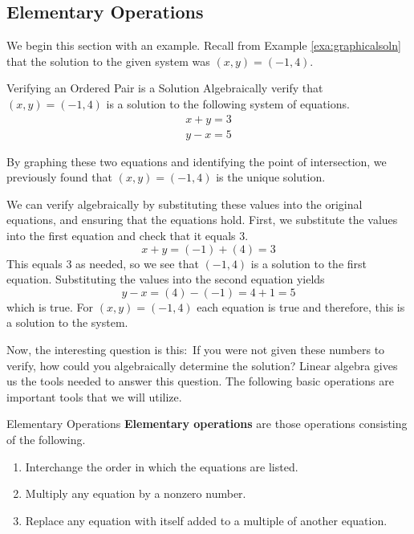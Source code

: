 \subsection{Elementary Operations}

We begin this section with an example. Recall from Example \ref{exa:graphicalsoln} that the solution to the given system was $\left(x, y \right) = \left( -1, 4 \right)$. 

\begin{example}{Verifying an Ordered Pair is a Solution}\label{exa:verifyingorderedpairsolution}
Algebraically verify that $\left(x, y \right) = \left( -1, 4 \right)$ is a solution to the following system of equations.
\[
\begin{array}{c}
x+y=3 \\
y-x=5  
\label{eq1.2.1}
\end{array}
\]
\end{example}

\begin{solution} 
By graphing these two equations and identifying the point of
intersection, we previously found that $\left(x, y \right) = \left(
-1, 4 \right)$ is the unique solution.

We can verify algebraically by substituting these values
into the original equations, and ensuring that the equations hold. 
First, we substitute the values into the first equation and check that it equals $3$. 
\[
x + y = (-1)+(4) = 3
\]
This equals $3$ as needed, so we see that $\left( -1,4 \right)$ is a solution to the first equation. 
Substituting the values into the second equation yields
\[
y -x = (4) - (-1) = 4 + 1  = 5
\]
which is true.
For
$\left( x,y\right) =\left( -1,4\right) $ each equation is true and therefore, this is a solution to the system.
\end{solution}

Now, the interesting question is this:\ If you were not given
these numbers to verify, how could you algebraically determine the solution? Linear algebra gives us the tools needed to answer this
question. The following basic operations are important tools that we will  utilize.

\begin{definition}{Elementary Operations}\label{def:elementaryoperations}
\textbf{Elementary operations}  are those
operations consisting of the following.

\begin{enumerate}
\item Interchange the order in which the equations are listed.

\item Multiply any equation by a nonzero number.

\item Replace any equation with itself added to a multiple of another
equation.

\end{enumerate}
\end{definition}

